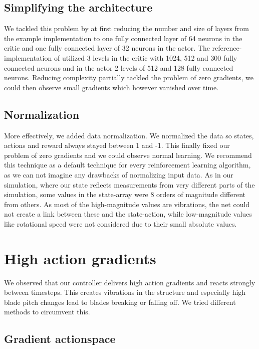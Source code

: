 \documentclass[hyperref,german,beleg]{cgvpub}
\begin{document}
\subsection{Simplifying the architecture}

We tackled this problem by at first reducing the number and size of layers from the example implementation to one fully connected layer of 64 neurons in the critic and one fully connected layer of 32 neurons in the actor. The reference-implementation of \cite{DeepDeterministicPolicy} utilized 3 levels in the critic with 1024, 512 and 300 fully connected neurons and in the actor 2 levels of 512 and 128 fully connected neurons. Reducing complexity partially tackled the problem of zero gradients, we could then observe small gradients which however vanished over time.

\subsection{Normalization}

More effectively, we added data normalization. We normalized the data so states, actions and reward always stayed between 1 and -1. This finally fixed our problem of zero gradients and we could observe normal learning. We recommend this technique as a default technique for every reinforcement learning algorithm, as we can not imagine any drawbacks of normalizing input data. As in our simulation, where our state reflects measurements from very different parts of the simulation, some values in the state-array were 8 orders of magnitude different from others. As most of the high-magnitude values are vibrations, the net could not create a link between these and the state-action, while low-magnitude values like rotational speed were not considered due to their small absolute values.

\section{High action gradients}

We observed that our controller delivers high action gradients and reacts strongly between timesteps. This creates vibrations in the structure and especially high blade pitch changes lead to blades breaking or falling off. We tried different methods to circumvent this.

\subsection{Gradient actionspace}
\end{document}

